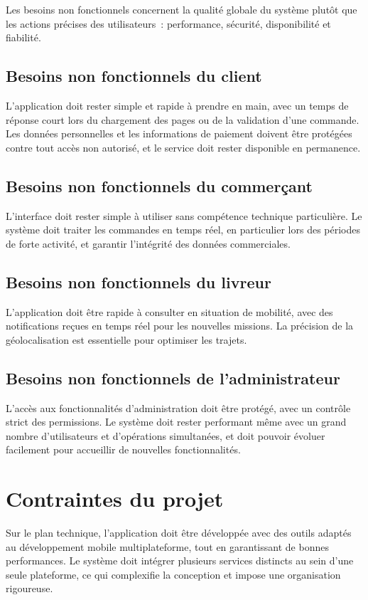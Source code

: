\documentclass[12pt,fleqn,a4paper]{report}
\begin{document}
\begin{justify}
Les besoins non fonctionnels concernent la qualité globale du système plutôt que les actions précises des utilisateurs~: performance, sécurité, disponibilité et fiabilité.

\subsection{Besoins non fonctionnels du client}
L'application doit rester simple et rapide à prendre en main, avec un temps de réponse court lors du chargement des pages ou de la validation d'une commande. Les données personnelles et les informations de paiement doivent être protégées contre tout accès non autorisé, et le service doit rester disponible en permanence.

\subsection{Besoins non fonctionnels du commerçant}
L'interface doit rester simple à utiliser sans compétence technique particulière. Le système doit traiter les commandes en temps réel, en particulier lors des périodes de forte activité, et garantir l'intégrité des données commerciales.

\subsection{Besoins non fonctionnels du livreur}
L'application doit être rapide à consulter en situation de mobilité, avec des notifications reçues en temps réel pour les nouvelles missions. La précision de la géolocalisation est essentielle pour optimiser les trajets.

\subsection{Besoins non fonctionnels de l'administrateur}
L'accès aux fonctionnalités d'administration doit être protégé, avec un contrôle strict des permissions. Le système doit rester performant même avec un grand nombre d'utilisateurs et d'opérations simultanées, et doit pouvoir évoluer facilement pour accueillir de nouvelles fonctionnalités.

\section{Contraintes du projet}

Sur le plan technique, l'application doit être développée avec des outils adaptés au développement mobile multiplateforme, tout en garantissant de bonnes performances. Le système doit intégrer plusieurs services distincts au sein d'une seule plateforme, ce qui complexifie la conception et impose une organisation rigoureuse.


\end{justify}
\end{document}
